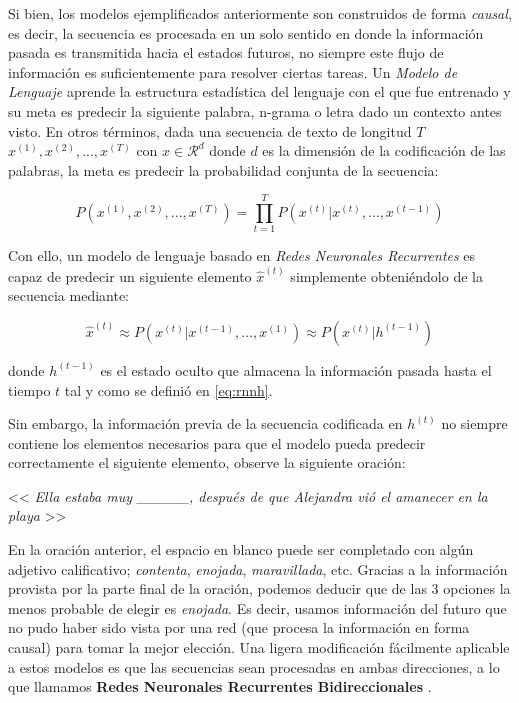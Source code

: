 Si bien, los modelos ejemplificados anteriormente son construidos de forma \textit{causal}, es
decir, la secuencia es procesada en un solo sentido en donde la información pasada es transmitida
hacia el estados futuros, no siempre este flujo de información es suficientemente para resolver
ciertas tareas. Un \textit{Modelo de Lenguaje} aprende la estructura estadística del lenguaje con el
que fue entrenado y su meta es predecir la siguiente palabra, n-grama o letra dado un contexto antes
visto. En otros términos, dada una secuencia de texto de longitud
$T$ $x^{(1)}, x^{(2)}, ..., x^{(T)}$
con $x \in \mathcal{R}^d$ donde $d$ es la dimensión de la codificación de las palabras,
la meta es predecir la probabilidad conjunta de la secuencia:

\begin{equation}
    P(x^{(1)}, x^{(2)}, ..., x^{(T)}) = \prod_{t=1}^{T} P(x^{(t)} | x^{(t)}, \dots , x^{(t-1)})
\end{equation}

Con ello, un modelo de lenguaje basado en \textit{Redes Neuronales Recurrentes} es capaz de predecir
un siguiente elemento $\hat x^{(t)}$ simplemente obteniéndolo de la secuencia mediante:

\begin{equation}
    \hat x^{(t)} \approx P(x^{(t)} | x^{(t-1)}, \dots, x^{(1)}) \approx P(x^{(t)} | h^{(t-1)})
\end{equation}

donde $h^{(t-1)}$ es el estado oculto que almacena la información pasada hasta el tiempo $t$
tal y como se definió en \ref{eq:rnnh}.

Sin embargo, la información previa de la secuencia codificada en $h^{(t)}$ no siempre contiene los
elementos necesarios para que el modelo pueda predecir correctamente el siguiente elemento,
observe la siguiente oración:

\begin{center}
    << \textit{Ella estaba muy \_\_\_\_\_, después de que Alejandra vió el amanecer en la playa } >>
\end{center}

En la oración anterior, el espacio en blanco puede ser completado con algún adjetivo calificativo;
\textit{contenta}, \textit{enojada}, \textit{maravillada}, etc. Gracias a la información provista por
la parte final de la oración, podemos deducir que de las 3 opciones la menos probable de
elegir es \textit{enojada}. Es decir, usamos información del futuro que no pudo haber sido vista por
una red (que procesa la información en forma causal) para tomar la mejor elección. Una ligera
modificación fácilmente aplicable a estos modelos es que las secuencias sean procesadas
en ambas direcciones, a lo que llamamos \textbf{Redes Neuronales Recurrentes Bidireccionales}
\cite{Schuster}.

